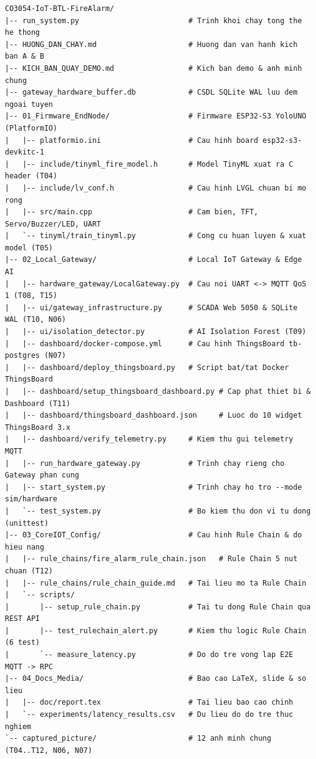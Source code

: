 \begin{lstlisting}[caption={Cấu trúc thư mục mã nguồn thực tế của dự án \texttt{CO3054-IoT-BTL-FireAlarm}}, label={lst:folder-tree}]
CO3054-IoT-BTL-FireAlarm/
|-- run_system.py                         # Trinh khoi chay tong the he thong
|-- HUONG_DAN_CHAY.md                     # Huong dan van hanh kich ban A & B
|-- KICH_BAN_QUAY_DEMO.md                 # Kich ban demo & anh minh chung
|-- gateway_hardware_buffer.db            # CSDL SQLite WAL luu dem ngoai tuyen
|-- 01_Firmware_EndNode/                  # Firmware ESP32-S3 YoloUNO (PlatformIO)
|   |-- platformio.ini                    # Cau hinh board esp32-s3-devkitc-1
|   |-- include/tinyml_fire_model.h       # Model TinyML xuat ra C header (T04)
|   |-- include/lv_conf.h                 # Cau hinh LVGL chuan bi mo rong
|   |-- src/main.cpp                      # Cam bien, TFT, Servo/Buzzer/LED, UART
|   `-- tinyml/train_tinyml.py            # Cong cu huan luyen & xuat model (T05)
|-- 02_Local_Gateway/                     # Local IoT Gateway & Edge AI
|   |-- hardware_gateway/LocalGateway.py  # Cau noi UART <-> MQTT QoS 1 (T08, T15)
|   |-- ui/gateway_infrastructure.py      # SCADA Web 5050 & SQLite WAL (T10, N06)
|   |-- ui/isolation_detector.py          # AI Isolation Forest (T09)
|   |-- dashboard/docker-compose.yml      # Cau hinh ThingsBoard tb-postgres (N07)
|   |-- dashboard/deploy_thingsboard.py   # Script bat/tat Docker ThingsBoard
|   |-- dashboard/setup_thingsboard_dashboard.py # Cap phat thiet bi & Dashboard (T11)
|   |-- dashboard/thingsboard_dashboard.json     # Luoc do 10 widget ThingsBoard 3.x
|   |-- dashboard/verify_telemetry.py     # Kiem thu gui telemetry MQTT
|   |-- run_hardware_gateway.py           # Trinh chay rieng cho Gateway phan cung
|   |-- start_system.py                   # Trinh chay ho tro --mode sim/hardware
|   `-- test_system.py                    # Bo kiem thu don vi tu dong (unittest)
|-- 03_CoreIOT_Config/                    # Cau hinh Rule Chain & do hieu nang
|   |-- rule_chains/fire_alarm_rule_chain.json   # Rule Chain 5 nut chuan (T12)
|   |-- rule_chains/rule_chain_guide.md   # Tai lieu mo ta Rule Chain
|   `-- scripts/
|       |-- setup_rule_chain.py           # Tai tu dong Rule Chain qua REST API
|       |-- test_rulechain_alert.py       # Kiem thu logic Rule Chain (6 test)
|       `-- measure_latency.py            # Do do tre vong lap E2E MQTT -> RPC
|-- 04_Docs_Media/                        # Bao cao LaTeX, slide & so lieu
|   |-- doc/report.tex                    # Tai lieu bao cao chinh
|   `-- experiments/latency_results.csv   # Du lieu do do tre thuc nghiem
`-- captured_picture/                     # 12 anh minh chung (T04..T12, N06, N07)
\end{lstlisting}

